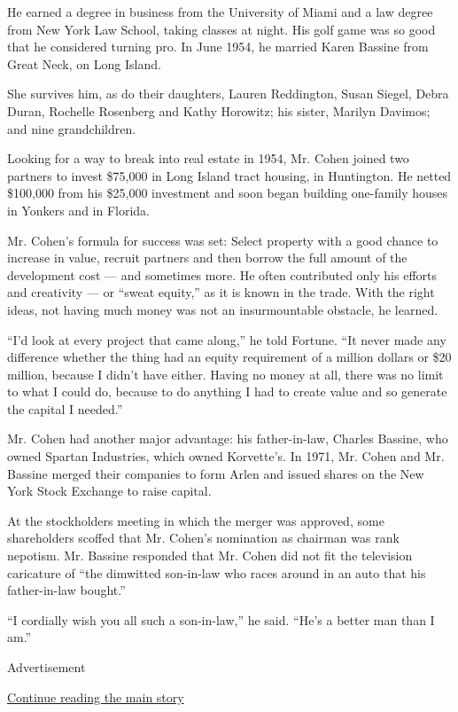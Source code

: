 He earned a degree in business from the University of Miami and a law
degree from New York Law School, taking classes at night. His golf game
was so good that he considered turning pro. In June 1954, he married
Karen Bassine from Great Neck, on Long Island.

She survives him, as do their daughters, Lauren Reddington, Susan
Siegel, Debra Duran, Rochelle Rosenberg and Kathy Horowitz; his sister,
Marilyn Davimos; and nine grandchildren.

Looking for a way to break into real estate in 1954, Mr. Cohen joined
two partners to invest \$75,000 in Long Island tract housing, in
Huntington. He netted \$100,000 from his \$25,000 investment and soon
began building one-family houses in Yonkers and in Florida.

Mr. Cohen's formula for success was set: Select property with a good
chance to increase in value, recruit partners and then borrow the full
amount of the development cost --- and sometimes more. He often
contributed only his efforts and creativity --- or ``sweat equity,'' as
it is known in the trade. With the right ideas, not having much money
was not an insurmountable obstacle, he learned.

``I'd look at every project that came along,'' he told Fortune. ``It
never made any difference whether the thing had an equity requirement of
a million dollars or \$20 million, because I didn't have either. Having
no money at all, there was no limit to what I could do, because to do
anything I had to create value and so generate the capital I needed.''

Mr. Cohen had another major advantage: his father-in-law, Charles
Bassine, who owned Spartan Industries, which owned Korvette's. In 1971,
Mr. Cohen and Mr. Bassine merged their companies to form Arlen and
issued shares on the New York Stock Exchange to raise capital.

At the stockholders meeting in which the merger was approved, some
shareholders scoffed that Mr. Cohen's nomination as chairman was rank
nepotism. Mr. Bassine responded that Mr. Cohen did not fit the
television caricature of ``the dimwitted son-in-law who races around in
an auto that his father-in-law bought.''

``I cordially wish you all such a son-in-law,'' he said. ``He's a better
man than I am.''

Advertisement

\protect\hyperlink{after-bottom}{Continue reading the main story}


